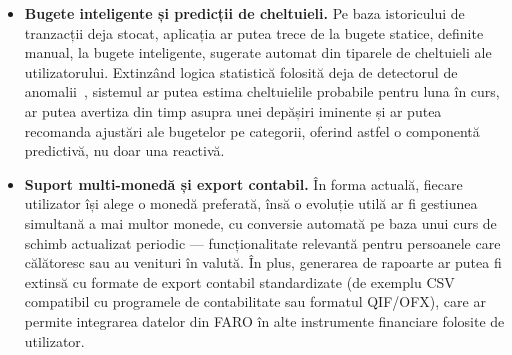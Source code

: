 \documentclass[12pt,a4paper,oneside]{report}
\begin{document}
\begin{itemize}[leftmargin=2cm,itemsep=4pt]
  \item \textbf{Bugete inteligente și predicții de cheltuieli.} Pe baza istoricului de tranzacții deja stocat, aplicația ar putea trece de la bugete statice, definite manual, la bugete inteligente, sugerate automat din tiparele de cheltuieli ale utilizatorului. Extinzând logica statistică folosită deja de detectorul de anomalii~\cite{ref:zscore}, sistemul ar putea estima cheltuielile probabile pentru luna în curs, ar putea avertiza din timp asupra unei depășiri iminente și ar putea recomanda ajustări ale bugetelor pe categorii, oferind astfel o componentă predictivă, nu doar una reactivă.

  \item \textbf{Suport multi-monedă și export contabil.} În forma actuală, fiecare utilizator își alege o monedă preferată, însă o evoluție utilă ar fi gestiunea simultană a mai multor monede, cu conversie automată pe baza unui curs de schimb actualizat periodic --- funcționalitate relevantă pentru persoanele care călătoresc sau au venituri în valută. În plus, generarea de rapoarte ar putea fi extinsă cu formate de export contabil standardizate (de exemplu CSV compatibil cu programele de contabilitate sau formatul QIF/OFX), care ar permite integrarea datelor din FARO în alte instrumente financiare folosite de utilizator.
\end{itemize}

\renewcommand{\bibname}{BIBLIOGRAFIE}
\end{document}
